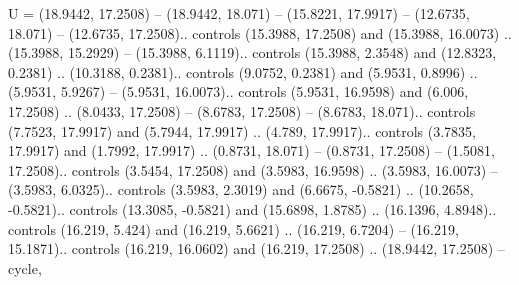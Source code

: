 {U} = {(18.9442, 17.2508) -- (18.9442, 18.071) -- (15.8221, 17.9917) -- (12.6735, 18.071) -- (12.6735, 17.2508).. controls (15.3988, 17.2508) and (15.3988, 16.0073) .. (15.3988, 15.2929) -- (15.3988, 6.1119).. controls (15.3988, 2.3548) and (12.8323, 0.2381) .. (10.3188, 0.2381).. controls (9.0752, 0.2381) and (5.9531, 0.8996) .. (5.9531, 5.9267) -- (5.9531, 16.0073).. controls (5.9531, 16.9598) and (6.006, 17.2508) .. (8.0433, 17.2508) -- (8.6783, 17.2508) -- (8.6783, 18.071).. controls (7.7523, 17.9917) and (5.7944, 17.9917) .. (4.789, 17.9917).. controls (3.7835, 17.9917) and (1.7992, 17.9917) .. (0.8731, 18.071) -- (0.8731, 17.2508) -- (1.5081, 17.2508).. controls (3.5454, 17.2508) and (3.5983, 16.9598) .. (3.5983, 16.0073) -- (3.5983, 6.0325).. controls (3.5983, 2.3019) and (6.6675, -0.5821) .. (10.2658, -0.5821).. controls (13.3085, -0.5821) and (15.6898, 1.8785) .. (16.1396, 4.8948).. controls (16.219, 5.424) and (16.219, 5.6621) .. (16.219, 6.7204) -- (16.219, 15.1871).. controls (16.219, 16.0602) and (16.219, 17.2508) .. (18.9442, 17.2508) -- cycle},
